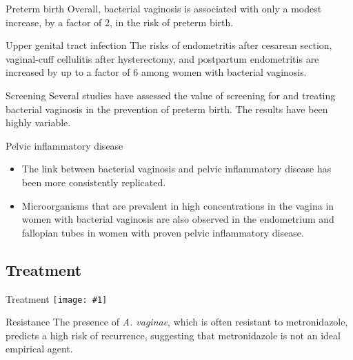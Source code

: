 \documentclass{beamer}
\newcommand*{\solo}[1]{\centering\texttt{[image: \#1]}}
\begin{document}
\begin{frame}{Preterm birth}
    Overall, bacterial vaginosis is associated with only a modest increase, by
    a factor of 2, in the risk of preterm birth.
\end{frame}

\begin{frame}{Upper genital tract infection}
    The risks of endometritis after cesarean section, vaginal-cuff cellulitis
    after hysterectomy, and postpartum endometritis are increased by up to a
    factor of 6 among women with bacterial vaginosis.
\end{frame}

\begin{frame}{Screening}
    Several studies have assessed the value of screening for and treating
    bacterial vaginosis in the prevention of preterm birth. The results have
    been highly variable.
\end{frame}

\begin{frame}{Pelvic inflammatory disease}
    \begin{itemize}
        \item The link between bacterial vaginosis and pelvic inflammatory
              disease has been more consistently replicated.
        \item Microorganisms that are prevalent in high concentrations in the
              vagina in women with bacterial vaginosis are also observed in the
              endometrium and fallopian tubes in women with proven pelvic
              inflammatory disease.
    \end{itemize}
\end{frame}

\subsection{Treatment}
\begin{frame}{Treatment}
    \solo{T2.eps}
\end{frame}

\begin{frame}{Resistance}
    The presence of \textit{A. vaginae}, which is often resistant to
    metronidazole, predicts a high risk of recurrence, suggesting that
    metronidazole is not an ideal empirical agent.
\end{frame}
\end{document}
